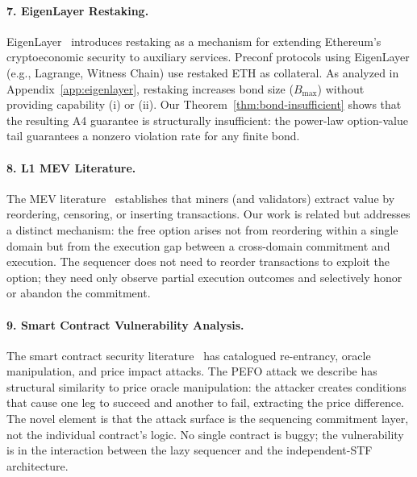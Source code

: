 \paragraph{7. EigenLayer Restaking.}
EigenLayer~\cite{eigenlayer-whitepaper} introduces restaking as a mechanism for
extending Ethereum's cryptoeconomic security to auxiliary services. Preconf
protocols using EigenLayer (e.g., Lagrange, Witness Chain) use restaked ETH as
collateral. As analyzed in Appendix~\ref{app:eigenlayer}, restaking increases
bond size ($B_{\max}$) without providing capability (i) or (ii). Our
Theorem~\ref{thm:bond-insufficient} shows that the resulting A4 guarantee
is structurally insufficient: the power-law option-value tail guarantees a
nonzero violation rate for any finite bond.

\paragraph{8. L1 MEV Literature.}
The MEV literature~\cite{daian2020flash, flashbots2021mev} establishes that
miners (and validators) extract value by reordering, censoring, or inserting
transactions. Our work is related but addresses a distinct mechanism: the
free option arises not from reordering within a single domain but from the
execution gap between a cross-domain commitment and execution. The sequencer
does not need to reorder transactions to exploit the option; they need only
observe partial execution outcomes and selectively honor or abandon the
commitment.

\paragraph{9. Smart Contract Vulnerability Analysis.}
The smart contract security literature~\cite{luu2016making} has
catalogued re-entrancy, oracle manipulation, and price impact attacks.
The PEFO attack we describe has structural similarity to price oracle
manipulation: the attacker creates conditions that cause one leg to succeed
and another to fail, extracting the price difference. The novel element is
that the attack surface is the sequencing commitment layer, not the individual
contract's logic. No single contract is buggy; the vulnerability is in the
interaction between the lazy sequencer and the independent-STF architecture.
